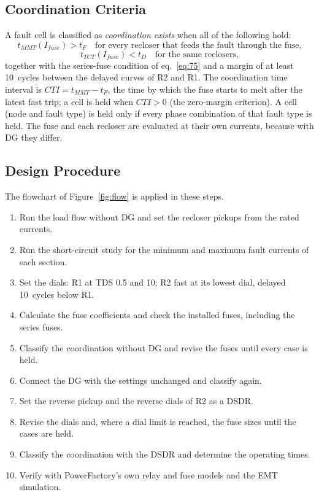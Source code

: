 \documentclass[12pt,a4paper]{article}
\newcommand{\PF}{PowerFactory}
\begin{document}
\subsection{Coordination Criteria}
A fault cell is classified as \emph{coordination exists} when all of the following hold:
\begin{equation}
t_{MMT}(I_{fuse}) > t_F \quad\text{for every recloser that feeds the fault through the fuse,}
\label{eq:crit1}
\end{equation}
\begin{equation}
t_{TCT}(I_{fuse}) < t_D \quad\text{for the same reclosers,}
\label{eq:crit2}
\end{equation}
together with the series-fuse condition of eq.~\eqref{eq:75} and a margin of at least 10~cycles
between the delayed curves of R2 and R1. The coordination time interval is $CTI = t_{MMT} - t_F$, the time by
which the fuse starts to melt after the latest fast trip; a cell is held when $CTI > 0$ (the zero-margin
criterion). A cell (node and fault type) is held only if every phase
combination of that fault type is held. The fuse and each recloser are evaluated at their own currents,
because with DG they differ.

\subsection{Design Procedure}
The flowchart of Figure~\ref{fig:flow} is applied in these steps.
\begin{enumerate}[itemsep=1pt]
\item Run the load flow without DG and set the recloser pickups from the rated currents.
\item Run the short-circuit study for the minimum and maximum fault currents of each section.
\item Set the dials: R1 at TDS 0.5 and 10; R2 fast at its lowest dial, delayed 10~cycles below R1.
\item Calculate the fuse coefficients and check the installed fuses, including the series fuses.
\item Classify the coordination without DG and revise the fuses until every case is held.
\item Connect the DG with the settings unchanged and classify again.
\item Set the reverse pickup and the reverse dials of R2 as a DSDR.
\item Revise the dials and, where a dial limit is reached, the fuse sizes until the cases are held.
\item Classify the coordination with the DSDR and determine the operating times.
\item Verify with \PF's own relay and fuse models and the EMT simulation.
\end{enumerate}
\end{document}
